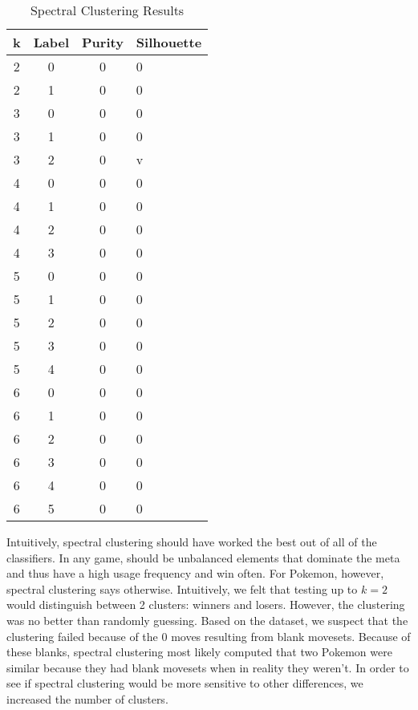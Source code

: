 \documentclass{acm_proc_article-sp}
\begin{document}
\begin{table}

\centering

\caption{Spectral Clustering Results}

\begin{tabular}{|c|c|c|l|} \hline

k & Label & Purity & Silhouette \\ \hline
2 & 0 & 0 & 0 \\ \hline
2 & 1 & 0 & 0 \\ \hline
3 & 0 & 0 & 0 \\ \hline
3 & 1 & 0 & 0 \\ \hline
3 & 2 & 0 & v \\ \hline
4 & 0 & 0 & 0 \\ \hline
4 & 1 & 0 & 0 \\ \hline
4 & 2 & 0 & 0 \\ \hline
4 & 3 & 0 & 0 \\ \hline
5 & 0 & 0 & 0 \\ \hline
5 & 1 & 0 & 0 \\ \hline
5 & 2 & 0 & 0 \\ \hline
5 & 3 & 0 & 0 \\ \hline
5 & 4 & 0 & 0 \\ \hline
6 & 0 & 0 & 0 \\ \hline
6 & 1 & 0 & 0 \\ \hline
6 & 2 & 0 & 0 \\ \hline
6 & 3 & 0 & 0 \\ \hline
6 & 4 & 0 & 0 \\ \hline
6 & 5 & 0 & 0 \\ \hline
\end{tabular}

\end{table}

Intuitively, spectral clustering should have worked the best out of all of the classifiers. In any game, should be unbalanced elements that dominate the meta and thus have a high usage frequency and win often. For Pokemon, however, spectral clustering says otherwise. Intuitively, we felt that testing up to $k=2$ would distinguish between 2 clusters: winners and losers. However, the clustering was no better than randomly guessing. Based on the dataset, we suspect that the clustering failed because of the 0 moves resulting from blank movesets. Because of these blanks, spectral clustering most likely computed that two Pokemon were similar because they had blank movesets when in reality they weren't. In order to see if spectral clustering would be more sensitive to other differences, we increased the number of clusters.
\end{document}
